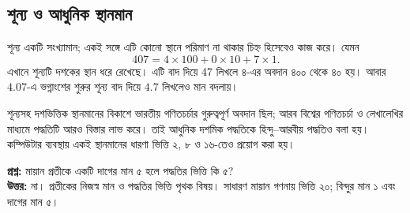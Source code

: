 \subsection{শূন্য ও আধুনিক স্থানমান}
শূন্য একটি সংখ্যামান; একই সঙ্গে এটি কোনো স্থানে পরিমাণ না থাকার চিহ্ন হিসেবেও কাজ করে। যেমন
\[407=4\times100+0\times10+7\times1.\]
এখানে শূন্যটি দশকের স্থান ধরে রেখেছে। এটি বাদ দিয়ে 47 লিখলে ৪-এর অবদান ৪০০ থেকে ৪০ হয়। আবার $4.07$-এ ভগ্নাংশের শুরুর শূন্য বাদ দিয়ে $4.7$ লিখলেও মান বদলায়।

শূন্যসহ দশভিত্তিক স্থানমানের বিকাশে ভারতীয় গণিতচর্চার গুরুত্বপূর্ণ অবদান ছিল; আরব বিশ্বের গণিতচর্চা ও লেখালেখির মাধ্যমে পদ্ধতিটি আরও বিস্তার লাভ করে। তাই আধুনিক দশমিক পদ্ধতিকে হিন্দু–আরবীয় পদ্ধতিও বলা হয়। কম্পিউটার ব্যবস্থায় একই স্থানমানের ধারণা ভিত্তি ২, ৮ ও ১৬-তেও প্রয়োগ করা হয়।

\textbf{প্রশ্ন:} মায়ান প্রতীকে একটি দাগের মান ৫ হলে পদ্ধতির ভিত্তি কি ৫?\\
\textbf{উত্তর:} না। প্রতীকের নিজস্ব মান ও পদ্ধতির ভিত্তি পৃথক বিষয়। সাধারণ মায়ান গণনায় ভিত্তি ২০; বিন্দুর মান ১ এবং দাগের মান ৫।
